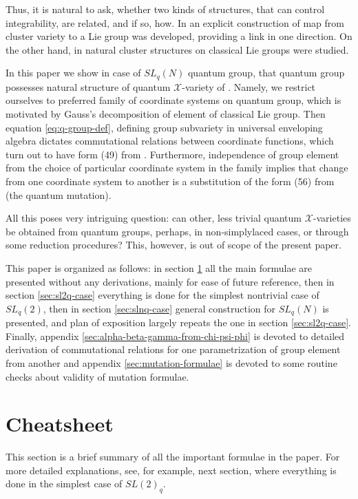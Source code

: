 \documentclass{article}
\newcommand {\?}{\textit{???}}
\def\Chi{\mathcal{X}}
\begin{document}
Thus, it is natural to ask, whether two kinds of structures, that can control integrability,
are related, and if so, how. In \cite{FG2} an explicit construction of map from cluster variety
to a Lie group was developed, providing a link in one direction. On the other hand,
in \cite{GShV} natural cluster structures on classical Lie groups were studied.

In this paper we show in case of $SL_q(N)$ quantum group, that quantum group possesses natural
structure of quantum $\Chi$-variety of \cite{FG1}. Namely, we restrict ourselves to preferred
family of coordinate systems on quantum group, which is motivated by Gauss's decomposition of
element of classical Lie group. Then equation \eqref{eq:q-group-def},
 defining group subvariety in universal enveloping algebra dictates commutational
relations between coordinate functions, which turn out to have form (49) from \cite{FG1}.
Furthermore, independence of group element from the choice of particular coordinate system
 in the family implies that change from one coordinate system to another
is a substitution of the form (56) from \cite{FG1} (the quantum mutation).

All this poses very intriguing question: can other, less trivial quantum $\Chi$-varieties be
obtained from quantum groups, perhaps, in non-simplylaced cases, or through some reduction procedures?
This, however, is out of scope of the present paper.

This paper is organized as follows: in section \ref{sec:cheatsheet} all the main formulae are
presented without any derivations, mainly for ease of future reference, then
in section \ref{sec:sl2q-case} everything is done for the simplest nontrivial case of $SL_q(2)$,
then in section \ref{sec:slnq-case} general construction for $SL_q(N)$ is presented, and plan
of exposition largely repeats the one in section \ref{sec:sl2q-case}. Finally,
appendix \ref{sec:alpha-beta-gamma-from-chi-psi-phi} is devoted to detailed derivation of commutational
relations for one parametrization of group element from another and appendix \ref{sec:mutation-formulae}
is devoted to some routine checks about validity of mutation formulae.


\section{Cheatsheet}
\label{sec:cheatsheet}

This section is a brief summary of all the important formulae in the paper.
For more detailed explanations, see, for example, next section, where everything is
 done in the simplest case of $SL(2)_q$.
\end{document}
